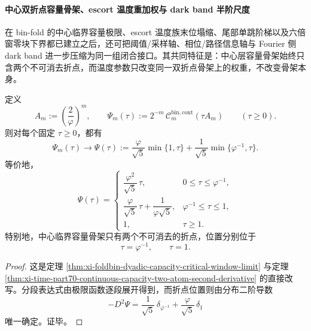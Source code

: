 \paragraph{中心双折点容量骨架、escort 温度重加权与 dark band 半阶尺度}
在 bin-fold 的中心临界容量极限、escort 温度族末位塌缩、尾部单跳阶梯以及六倍窗零块下界都已建立之后，还可把阈值/采样轴、相位/路径信息轴与 Fourier 侧 dark band 进一步压缩为同一组闭合接口。其共同特征是：中心层容量骨架始终只含两个不可消去折点，而温度参数只改变同一双折点骨架上的权重，不改变骨架本身。

\begin{theorem}[中心临界容量骨架的双折点闭式]\label{thm:xi-time-part70b-center-capacity-two-kink-skeleton}
定义
\[
A_m:=\left(\frac{2}{\varphi}\right)^m,
\qquad
\Psi_m(\tau):=
2^{-m}\,\mathcal C_m^{\mathrm{bin,cont}}(\tau A_m)
\qquad (\tau\ge 0).
\]
则对每个固定 \(\tau\ge 0\)，都有
\[
\Psi_m(\tau)\longrightarrow \Psi(\tau)
:=
\frac{\varphi}{\sqrt5}\min\{1,\tau\}
+
\frac{1}{\sqrt5}\min\{\varphi^{-1},\tau\}.
\]
等价地，
\[
\Psi(\tau)=
\begin{cases}
\dfrac{\varphi^2}{\sqrt5}\,\tau, & 0\le \tau\le \varphi^{-1},\\[6pt]
\dfrac{\varphi}{\sqrt5}\,\tau+\dfrac{1}{\varphi\sqrt5}, & \varphi^{-1}\le \tau\le 1,\\[8pt]
1, & \tau\ge 1.
\end{cases}
\]
特别地，中心临界容量骨架只有两个不可消去的折点，位置分别位于
\[
\tau=\varphi^{-1},
\qquad
\tau=1.
\]
\end{theorem}
\begin{proof}
这是定理 \ref{thm:xi-foldbin-dyadic-capacity-critical-window-limit} 与定理 \ref{thm:xi-time-part70-continuous-capacity-two-atom-second-derivative} 的直接改写。分段表达式由极限函数逐段展开得到，而折点位置则由分布二阶导数
\[
-D^2\Psi
=
\frac{1}{\sqrt5}\,\delta_{\varphi^{-1}}
+
\frac{\varphi}{\sqrt5}\,\delta_1
\]
唯一确定。证毕。
\end{proof}

